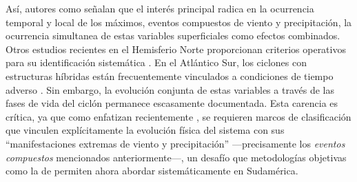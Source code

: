 Así, autores como \citet{zscheischler2018future} señalan que el interés principal radica en la ocurrencia temporal y local de los máximos, eventos compuestos de viento y precipitación, la ocurrencia simultanea de estas variables superficiales como efectos combinados. Otros estudios recientes en el Hemisferio Norte proporcionan criterios operativos para su identificación sistemática \citep{chen2025characteristics}. En el Atlántico Sur, los ciclones con estructuras híbridas están frecuentemente vinculados a condiciones de tiempo adverso \citep{marrafon2022classificacao}.
Sin embargo, la evolución conjunta de estas variables a través de las fases de vida del ciclón permanece escasamente documentada. Esta carencia es crítica, ya que como enfatizan recientemente \citet{han2025system}, se requieren marcos de clasificación que vinculen explícitamente la evolución física del sistema con sus ``manifestaciones extremas de viento y precipitación'' —precisamente los \textit{eventos compuestos} mencionados anteriormente—, un desafío que metodologías objetivas como la de \citet{coutodesouza2024new} permiten ahora abordar sistemáticamente en Sudamérica.
%

